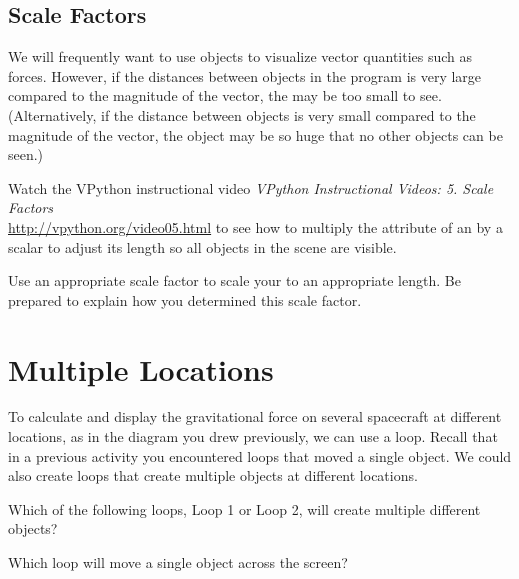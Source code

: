 \documentclass[11pt]{article}
\begin{document}
\subsection{Scale Factors}

We will frequently want to use  objects to visualize vector quantities such as forces.  However, if the distances between objects in the program is very large compared to the magnitude of the vector, the  may be too small to see.  (Alternatively, if the distance between objects is very small compared to the magnitude of the vector, the  object may be so huge that no other objects can be seen.)\\

\begin{compactitem}[\color{MIRed}$\Rightarrow$]
\item Watch the VPython instructional video \textit{VPython Instructional Videos: 5. Scale Factors }\\ \url{http://vpython.org/video05.html} to see how to multiply the  attribute of an  by a scalar to adjust its length so all objects in the scene are visible.
\item Use an appropriate scale factor to scale your  to an appropriate length.  Be prepared to explain how you determined this scale factor.\\
\end{compactitem}


\section{Multiple Locations}

To calculate and display the gravitational force on several spacecraft at different locations, as in the diagram you drew previously, we can use a loop.  Recall that in a previous activity you encountered loops that moved a single object. We could also create loops  that create multiple objects at different locations. \\ 

\begin{compactitem}[\color{MIRed}$\Rightarrow$]
\item Which of the following loops, Loop 1 or Loop 2, will create multiple different objects? 
\item Which loop will move a single object across the screen?\\
\end{compactitem}
\end{document}

